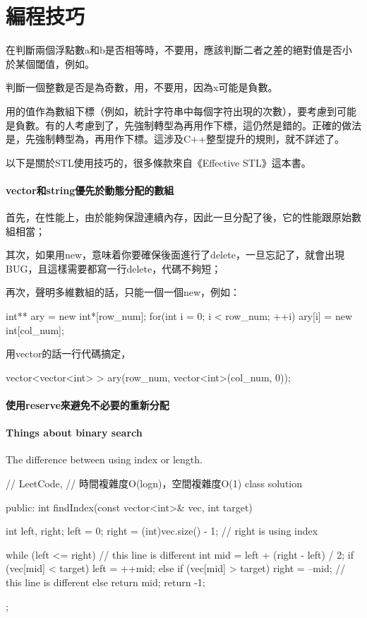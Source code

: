 \chapter{編程技巧}

在判斷兩個浮點數a和b是否相等時，不要用，應該判斷二者之差的絕對值是否小於某個閾值，例如。

判斷一個整數是否是為奇數，用，不要用，因為x可能是負數。

用的值作為數組下標（例如，統計字符串中每個字符出現的次數），要考慮到可能是負數。有的人考慮到了，先強制轉型為再用作下標，這仍然是錯的。正確的做法是，先強制轉型為，再用作下標。這涉及C++整型提升的規則，就不詳述了。

以下是關於STL使用技巧的，很多條款來自《Effective STL》這本書。

\subsubsection{vector和string優先於動態分配的數組}

首先，在性能上，由於能夠保證連續內存，因此一旦分配了後，它的性能跟原始數組相當；

其次，如果用new，意味着你要確保後面進行了delete，一旦忘記了，就會出現BUG，且這樣需要都寫一行delete，代碼不夠短；

再次，聲明多維數組的話，只能一個一個new，例如：
\begin{Code}
int** ary = new int*[row_num];
for(int i = 0; i < row_num; ++i)
    ary[i] = new int[col_num];
\end{Code}
用vector的話一行代碼搞定，
\begin{Code}
vector<vector<int> > ary(row_num, vector<int>(col_num, 0));
\end{Code}

\subsubsection{使用reserve來避免不必要的重新分配}
\subsubsection{Things about binary search}
The difference between using index or length.

\begin{Code}
// LeetCode, 
// 時間複雜度O(logn)，空間複雜度O(1)
class solution{
public:
    int findIndex(const vector<int>& vec, int target) {
        int left, right;
        left = 0; right = (int)vec.size() - 1; // right is using index
        
        while (left <= right) { // this line is different
            int mid = left + (right - left) / 2;
            if (vec[mid] < target)
                left = ++mid;
            else if (vec[mid] > target)
                right = --mid; // this line is different
            else
                return mid;
        }
        return -1;
    }
};
\end{Code}

